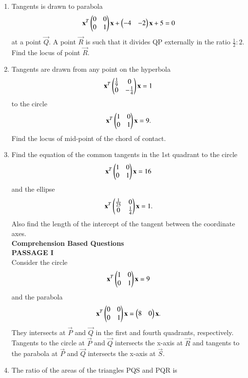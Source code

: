 \begin{enumerate}[label=\arabic*.,ref=\thesubsection.\theenumi]
    \item Tangents is drawn to parabola
    \begin{align}
    \mathbf{x}^T\begin{pmatrix}0&0\\0&1\end{pmatrix}\mathbf{x}+\begin{pmatrix}-4&-2\end{pmatrix}\mathbf{x}+5=0
    \end{align} at a point $\vec{Q}$. A point $\vec{R}$ is such that it divides QP externally in the ratio $\frac{1}{2}:2$. Find the locus of point $\vec{R}$.
    \item Tangents are drawn from any point on the hyperbola
    \begin{align}
    \mathbf{x}^T\begin{pmatrix}\frac{1}{9}&0\\0&-\frac{1}{4}\end{pmatrix}\mathbf{x}=1
    \end{align} to the circle
    \begin{align}
    \mathbf{x}^T\begin{pmatrix}1&0\\0&1\end{pmatrix}\mathbf{x}=9.
    \end{align} Find the locus of mid-point of the chord of contact.
    \item Find the equation of the common tangents in the 1st quadrant to the circle 
    \begin{align}
    \mathbf{x}^T\begin{pmatrix}1&0\\0&1\end{pmatrix}\mathbf{x}=16
    \end{align} and the ellipse
    \begin{align}
    \mathbf{x}^T\begin{pmatrix}\frac{1}{25}&0\\0&\frac{1}{4}\end{pmatrix}\mathbf{x}=1.
    \end{align} Also find the length of the intercept of the tangent between the coordinate axes.\\
    {\Large\textbf{Comprehension Based Questions}}\\
    \textbf{PASSAGE I}\\
    Consider the circle
    \begin{align}
    \mathbf{x}^T\begin{pmatrix}1&0\\0&1\end{pmatrix}\mathbf{x}=9
    \end{align} and the parabola
    \begin{align}
    \mathbf{x}^T\begin{pmatrix}0&0\\0&1\end{pmatrix}\mathbf{x}=\begin{pmatrix}8&0\end{pmatrix}\mathbf{x}.
    \end{align} They intersects at $\vec{P}$ and $\vec{Q}$ in the first and fourth quadrants, 				respectively. Tangents to the circle at $\vec{P}$ and $\vec{Q}$ intersects the x-axis at 
    $\vec{R}$ and tangents to the parabola at $\vec{P}$ and $\vec{Q}$ intersects the x-axis at 
    $\vec{S}$.
    \item The ratio of the areas of the triangles PQS and PQR is 

\end{enumerate}
